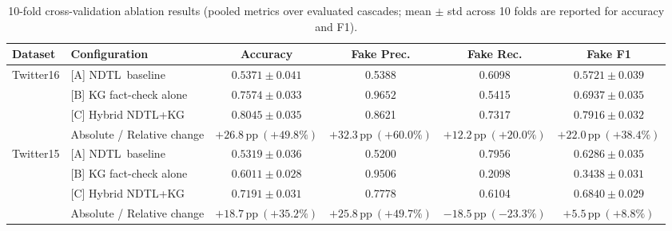 \documentclass[10pt,twocolumn,a4paper]{article}
\newcommand{\NDTL}{\textsc{NDTL}}
\begin{document}
\begin{table}[t]
\centering
\caption{10-fold cross-validation ablation results (pooled metrics over evaluated cascades; mean $\pm$ std across 10 folds are reported for accuracy and F1).}
\label{tab:ablation}
\small
\begin{tabular}{llcccc}
\toprule
Dataset & Configuration & Accuracy & Fake Prec. & Fake Rec. & Fake F1\\
\midrule
\multirow{4}{*}{Twitter16} & [A] \NDTL\ baseline & $0.5371 \pm 0.041$ & 0.5388 & 0.6098 & $0.5721 \pm 0.039$\\
 & [B] KG fact-check alone & $0.7574 \pm 0.033$ & $\mathbf{0.9652}$ & 0.5415 & $0.6937 \pm 0.035$\\
 & [C] Hybrid \NDTL+KG & $\mathbf{0.8045 \pm 0.035}$ & 0.8621 & $\mathbf{0.7317}$ & $\mathbf{0.7916 \pm 0.032}$\\
 & Absolute / Relative change & $+26.8\,\mathrm{pp}\ (+49.8\%)$ & $+32.3\,\mathrm{pp}\ (+60.0\%)$ & $+12.2\,\mathrm{pp}\ (+20.0\%)$ & $+22.0\,\mathrm{pp}\ (+38.4\%)$\\
\midrule
\multirow{4}{*}{Twitter15} & [A] \NDTL\ baseline & $0.5319 \pm 0.036$ & 0.5200 & $\mathbf{0.7956}$ & $0.6286 \pm 0.035$\\
 & [B] KG fact-check alone & $0.6011 \pm 0.028$ & $\mathbf{0.9506}$ & 0.2098 & $0.3438 \pm 0.031$\\
 & [C] Hybrid \NDTL+KG & $\mathbf{0.7191 \pm 0.031}$ & 0.7778 & 0.6104 & $\mathbf{0.6840 \pm 0.029}$\\
 & Absolute / Relative change & $+18.7\,\mathrm{pp}\ (+35.2\%)$ & $+25.8\,\mathrm{pp}\ (+49.7\%)$ & $-18.5\,\mathrm{pp}\ (-23.3\%)$ & $+5.5\,\mathrm{pp}\ (+8.8\%)$\\
\bottomrule
\end{tabular}
\end{table}
 
\end{document}
